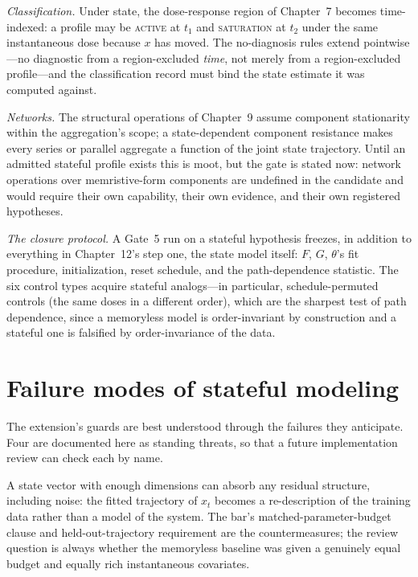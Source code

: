 \emph{Classification.} Under state, the dose-response region of Chapter~7 becomes time-indexed: a profile may be \textsc{active} at $t_1$ and \textsc{saturation} at $t_2$ under the same instantaneous dose because $x$ has moved. The no-diagnosis rules extend pointwise---no diagnostic from a region-excluded \emph{time}, not merely from a region-excluded profile---and the classification record must bind the state estimate it was computed against.

\emph{Networks.} The structural operations of Chapter~9 assume component stationarity within the aggregation's scope; a state-dependent component resistance makes every series or parallel aggregate a function of the joint state trajectory. Until an admitted stateful profile exists this is moot, but the gate is stated now: network operations over memristive-form components are undefined in the candidate and would require their own capability, their own evidence, and their own registered hypotheses.

\emph{The closure protocol.} A Gate~5 run on a stateful hypothesis freezes, in addition to everything in Chapter~12's step one, the state model itself: $F$, $G$, $\theta$'s fit procedure, initialization, reset schedule, and the path-dependence statistic. The six control types acquire stateful analogs---in particular, schedule-permuted controls (the same doses in a different order), which are the sharpest test of path dependence, since a memoryless model is order-invariant by construction and a stateful one is falsified by order-invariance of the data.

\section{Failure modes of stateful modeling}\label{mem:sec:failures}

The extension's guards are best understood through the failures they anticipate. Four are documented here as standing threats, so that a future implementation review can check each by name.

\begin{threat}\label{mem:threat:sponge}
A state vector with enough dimensions can absorb any residual structure, including noise: the fitted trajectory of $x_t$ becomes a re-description of the training data rather than a model of the system. The bar's matched-parameter-budget clause and held-out-trajectory requirement are the countermeasures; the review question is always whether the memoryless baseline was given a genuinely equal budget and equally rich instantaneous covariates.
\end{threat}

